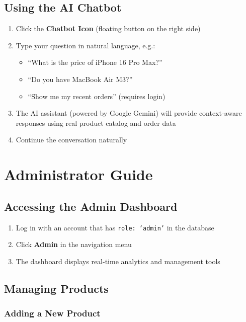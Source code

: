 \documentclass[12pt, a4paper]{report}
\begin{document}
{{\subsection{Using the AI Chatbot}

\begin{enumerate}
    \item Click the \textbf{Chatbot Icon} (floating button on the right side)
    \item Type your question in natural language, e.g.:
    \begin{itemize}
        \item ``What is the price of iPhone 16 Pro Max?''
        \item ``Do you have MacBook Air M3?''
        \item ``Show me my recent orders'' (requires login)
    \end{itemize}
    \item The AI assistant (powered by Google Gemini) will provide context-aware responses using real product catalog and order data
    \item Continue the conversation naturally
\end{enumerate}

\section{Administrator Guide}

\subsection{Accessing the Admin Dashboard}

\begin{enumerate}
    \item Log in with an account that has \texttt{role: 'admin'} in the database
    \item Click \textbf{Admin} in the navigation menu
    \item The dashboard displays real-time analytics and management tools
\end{enumerate}

\subsection{Managing Products}

\subsubsection{Adding a New Product}

}}
\end{document}
